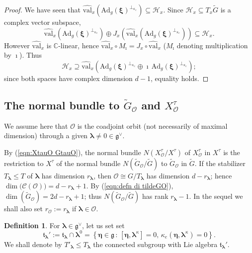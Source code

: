 \documentclass[12pt,a4paper]{article}
\theoremstyle{plain}
\theoremstyle{definition}
\newtheorem{defn}[thm]{Definition}%
\begin{document}
\begin{proof}
We have seen that
$\widehat{\mathrm{val}}_{x}\left(
\mathrm{Ad}_g(\boldsymbol{\xi})^{\perp_{\kappa_e}}\right)
\subseteq \mathcal{H}_x$.
Since $\mathcal{H}_x\subseteq T_x\tilde{G}$ is a complex
vector subspace, 
$$
\widehat{\mathrm{val}}_{x}\left(
\mathrm{Ad}_g(\boldsymbol{\xi})^{\perp_{\kappa_e}}\right)\oplus
J_x\left(\widehat{\mathrm{val}}_{x}\left(
\mathrm{Ad}_g(\boldsymbol{\xi})^{\perp_{\kappa_e}}\right)
\right)
\subseteq \mathcal{H}_x.
$$
However $\widehat{\mathrm{val}}_{x}$ is $\mathbb{C}$-linear,
hence $\widehat{\mathrm{val}}_{x}\circ M_\imath=J_x\circ 
\widehat{\mathrm{val}}_{x}$ ($M_\imath$ denoting multiplication
by $\imath$). 
Thus
$$
\mathcal{H}_x\supseteq\widehat{\mathrm{val}}_{x}\left(
\mathrm{Ad}_g(\boldsymbol{\xi})^{\perp_{\kappa_e}}\oplus
\imath\,\mathrm{Ad}_g(\boldsymbol{\xi})^{\perp_{\kappa_e}}  
\right)  ;
$$
since both spaces have complex dimension $d-1$,
equality holds.
\end{proof}


\subsection{The normal bundle to $\tilde{G}_{\mathcal{O}}$ and 
$X^\tau_{\mathcal{O}}$}

\label{sctn:normal bundle}

We assume here that $\mathcal{O}$ is the coadjoint orbit
(not necessarily of maximal dimension) through a given 
$\boldsymbol{\lambda}\neq 0\in \mathfrak{g}^\vee$.

By (\ref{eqn:XtauO GtauO}), the normal bundle 
$N(X^\tau_{\mathcal{O}}/X^\tau)$ of
$X^\tau_{\mathcal{O}}$ in $X^\tau$
is the restriction to $X^\tau$ of the normal bundle 
$N(\tilde{G}_{\mathcal{O}}/\tilde{G})$ to $\tilde{G}_{\mathcal{O}}$ in $\tilde{G}$.
%
%
%
If the stabilizer $T_{\boldsymbol{\lambda}}\leqslant T$ of 
$\boldsymbol{\lambda}$ has dimension $r_{\boldsymbol{\lambda}}$, then 
$\mathcal{O}\cong G/T_{\boldsymbol{\lambda}}$ has dimension 
$d-r_{\boldsymbol{\lambda}}$; hence 
$\dim\big(\mathcal{C}(\mathcal{O})  \big)=d-r_{\boldsymbol{\lambda}}+1$.
%
By (\ref{eqn:defn di tildeGO}), 
$\dim(\tilde{G}_{\mathcal{O}})=2d-r_{\boldsymbol{\lambda}}+1$; thus $N(\tilde{G}_{\mathcal{O}}/\tilde{G})$ has rank $r_{\boldsymbol{\lambda}}-1$.
%
In the sequel we shall also set
$r_{\mathcal{O}}:=r_{\boldsymbol{\lambda}}$ if 
$\boldsymbol{\lambda}\in \mathcal{O}$.
%

\begin{defn}
\label{defn:tlambda'}
For $\boldsymbol{\lambda}\in \mathfrak{g}^\vee$, let us set set
$$
\mathfrak{t}_{\boldsymbol{\lambda}}':=
\mathfrak{t}_{\boldsymbol{\lambda}}\cap \boldsymbol{\lambda}^0=
\left\{ \boldsymbol{\eta}\in \mathfrak{g}\,:\,
\left[\boldsymbol{\eta},\boldsymbol{\lambda}^\kappa\right]=0,\,
\kappa_e\left(\boldsymbol{\eta},\boldsymbol{\lambda}^\kappa\right)=0  \right\}.
$$
We shall denote by $T'_{\boldsymbol{\lambda}}\leqslant 
T_{\boldsymbol{\lambda}}$ the connected subgroup with Lie algebra
$\mathfrak{t}_{\boldsymbol{\lambda}}'$. 

\end{defn}
\end{document}
